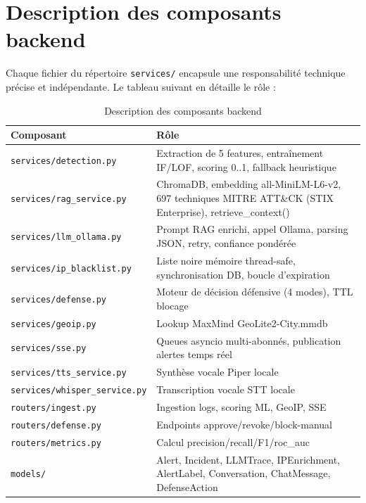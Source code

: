 \documentclass[12pt,a4paper]{report}
\begin{document}
\section{Description des composants backend}
\begin{onehalfspace}
Chaque fichier du répertoire \texttt{services/} encapsule une responsabilité
technique précise et indépendante. Le tableau suivant en détaille le rôle :
\end{onehalfspace}

\begin{table}[H]
\centering
\caption{Description des composants backend}
\label{tab:backend_composants}
\begin{tabular}{|p{5cm}|p{8.5cm}|}
\hline
\textbf{Composant} & \textbf{Rôle} \\
\hline
\texttt{services/detection.py} & Extraction de 5 features, entraînement
IF/LOF, scoring 0..1, fallback heuristique \\
\hline
\texttt{services/rag\_service.py} & ChromaDB, embedding all-MiniLM-L6-v2,
697 techniques MITRE ATT\&CK (STIX Enterprise), retrieve\_context() \\
\hline
\texttt{services/llm\_ollama.py} & Prompt RAG enrichi, appel Ollama,
parsing JSON, retry, confiance pondérée \\
\hline
\texttt{services/ip\_blacklist.py} & Liste noire mémoire thread-safe,
synchronisation DB, boucle d'expiration \\
\hline
\texttt{services/defense.py} & Moteur de décision défensive (4 modes),
TTL blocage \\
\hline
\texttt{services/geoip.py} & Lookup MaxMind GeoLite2-City.mmdb \\
\hline
\texttt{services/sse.py} & Queues asyncio multi-abonnés, publication
alertes temps réel \\
\hline
\texttt{services/tts\_service.py} & Synthèse vocale Piper locale \\
\hline
\texttt{services/whisper\_service.py} & Transcription vocale STT locale \\
\hline
\texttt{routers/ingest.py} & Ingestion logs, scoring ML, GeoIP, SSE \\
\hline
\texttt{routers/defense.py} & Endpoints approve/revoke/block-manual \\
\hline
\texttt{routers/metrics.py} & Calcul precision/recall/F1/roc\_auc \\
\hline
\texttt{models/} & Alert, Incident, LLMTrace, IPEnrichment, AlertLabel,
Conversation, ChatMessage, DefenseAction \\
\hline
\end{tabular}
\end{table}
\end{document}
